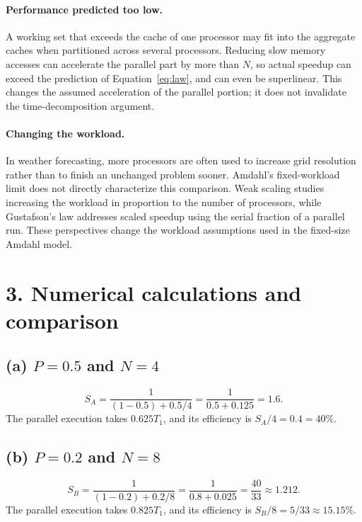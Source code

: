\documentclass[11pt,a4paper]{article}
\begin{document}
\paragraph{Performance predicted too low.}
A working set that exceeds the cache of one processor may fit into the aggregate caches
when partitioned across several processors. Reducing slow memory accesses
can accelerate the parallel part by more than $N$, so actual speedup can
exceed the prediction of Equation~\eqref{eq:law}, and can even be superlinear.
This changes the assumed acceleration of the parallel portion; it does not
invalidate the time-decomposition argument.

\paragraph{Changing the workload.}
In weather forecasting, more processors are often used to increase grid
resolution rather than to finish an unchanged
problem sooner. Amdahl's fixed-workload limit does not directly characterize
this comparison. Weak scaling studies increasing the workload in proportion
to the number of processors, while Gustafson's law addresses scaled speedup
using the serial fraction of a parallel run. These perspectives change the
workload assumptions used in the fixed-size Amdahl model.

\section*{3. Numerical calculations and comparison}
\subsection*{(a) $P=0.5$ and $N=4$}
\[
  S_A=\frac{1}{(1-0.5)+0.5/4}
     =\frac{1}{0.5+0.125}
     =\boxed{1.6}.
\]
The parallel execution takes $0.625T_1$, and its efficiency is
$S_A/4=0.4=40\%$.

\subsection*{(b) $P=0.2$ and $N=8$}
\[
  S_B=\frac{1}{(1-0.2)+0.2/8}
     =\frac{1}{0.8+0.025}
     =\boxed{\frac{40}{33}\approx1.212}.
\]
The parallel execution takes $0.825T_1$, and its efficiency is
$S_B/8=5/33\approx15.15\%$.
\end{document}
